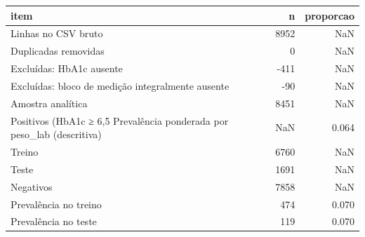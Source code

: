 \begin{tabular}{lrr}
\toprule
item & n & proporcao \\
\midrule
Linhas no CSV bruto & 8952 & NaN \\
Duplicadas removidas & 0 & NaN \\
Excluídas: HbA1c ausente & -411 & NaN \\
Excluídas: bloco de medição integralmente ausente & -90 & NaN \\
Amostra analítica & 8451 & NaN \\
Positivos (HbA1c ≥ 6,5%
Prevalência ponderada por peso_lab (descritiva) & NaN & 0.064 \\
Treino & 6760 & NaN \\
Teste & 1691 & NaN \\
Negativos & 7858 & NaN \\
Prevalência no treino & 474 & 0.070 \\
Prevalência no teste & 119 & 0.070 \\
\bottomrule
\end{tabular}
